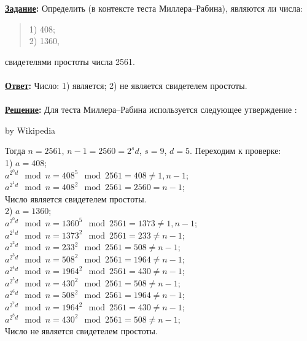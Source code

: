 \documentclass{article}
\begin{document}
\textbf{\uline{Задание}:} Определить (в контексте теста Миллера--Рабина), являются ли числа:
\begin{flushleft}
\begin{verse}
1) 408;\\
2) 1360,\end{verse}
\end{flushleft}
свидетелями простоты числа 2561.\\
\\
\textbf{\uline{Ответ}:} Число: 1) является; 2) не является свидетелем простоты.\\
\\
\textbf{ \uline{Решение}: } Для теста Миллера--Рабина используется следующее утверждение : \\
\noindent{}
\begin{flushright}\footnotesize by Wikipedia \end{flushright}
Тогда $n=2561$, $n-1=2560=2^{s}d$, $s=9$, $d=5$. Переходим к проверке:\\
1) $a=408$;\\
$a^{2^{0}d}\mod n=408^{5}\mod 2561=408\not=1, n-1$;\\
$a^{2^{1}d}\mod n=408^{2}\mod 2561=2560=n-1$;\\
Число является свидетелем простоты.\\
2) $a=1360$;\\
$a^{2^{0}d}\mod n=1360^{5}\mod 2561=1373\not=1, n-1$;\\
$a^{2^{1}d}\mod n=1373^{2}\mod 2561=233\not=n-1$;\\
$a^{2^{2}d}\mod n=233^{2}\mod 2561=508\not=n-1$;\\
$a^{2^{3}d}\mod n=508^{2}\mod 2561=1964\not=n-1$;\\
$a^{2^{4}d}\mod n=1964^{2}\mod 2561=430\not=n-1$;\\
$a^{2^{5}d}\mod n=430^{2}\mod 2561=508\not=n-1$;\\
$a^{2^{6}d}\mod n=508^{2}\mod 2561=1964\not=n-1$;\\
$a^{2^{7}d}\mod n=1964^{2}\mod 2561=430\not=n-1$;\\
$a^{2^{8}d}\mod n=430^{2}\mod 2561=508\not=n-1$;\\
Число не является свидетелем простоты.\\
\end{document}
